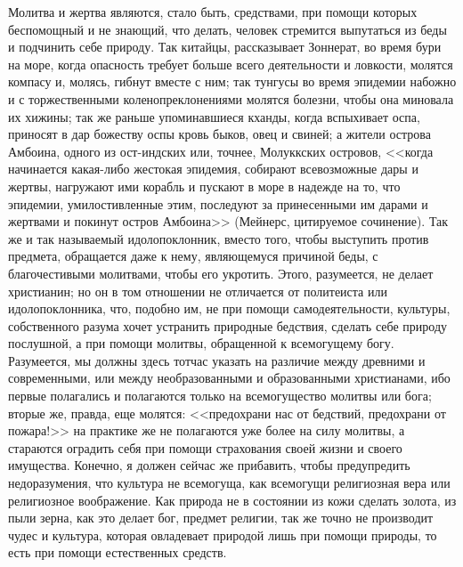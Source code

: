 \documentclass[12pt]{article}
\begin{document}
Молитва и жертва являются, стало быть, средствами, при помощи которых беспомощный и не знающий, что делать, человек стремится выпутаться из беды и подчинить себе природу. Так китайцы, рассказывает Зоннерат, во время бури на море, когда опасность требует больше всего деятельности и ловкости, молятся компасу и, молясь, гибнут вместе с ним; так тунгусы во время эпидемии набожно и с торжественными коленопреклонениями молятся болезни, чтобы она миновала их хижины; так же раньше упоминавшиеся кханды, когда вспыхивает оспа, приносят в дар божеству оспы кровь быков, овец и свиней; а жители острова Амбоина, одного из ост-индских или, точнее, Молуккских островов, <<когда начинается какая-либо жестокая эпидемия, собирают всевозможные дары и жертвы, нагружают ими корабль и пускают в море в надежде на то, что эпидемии, умилостивленные этим, последуют за принесенными им дарами и жертвами и покинут остров Амбоина>> (Мейнерс, цитируемое сочинение). Так же и так называемый идолопоклонник, вместо того, чтобы выступить против предмета, обращается даже к нему, являющемуся причиной беды, с благочестивыми молитвами, чтобы его укротить. Этого, разумеется, не делает христианин; но он в том отношении не отличается от политеиста или идолопоклонника, что, подобно им, не при помощи самодеятельности, культуры, собственного разума хочет устранить природные бедствия, сделать себе природу послушной, а при помощи молитвы, обращенной к всемогущему богу. Разумеется, мы должны здесь тотчас указать на различие между древними и современными, или между необразованными и образованными христианами, ибо первые полагались и полагаются только на всемогущество молитвы или бога; вторые же, правда, еще молятся: <<предохрани нас от бедствий, предохрани от пожара!>> на практике же не полагаются уже более на силу молитвы, а стараются оградить себя при помощи страхования своей жизни и своего имущества. Конечно, я должен сейчас же прибавить, чтобы предупредить недоразумения, что культура не всемогуща, как всемогущи религиозная вера или религиозное воображение. Как природа не в состоянии из кожи сделать золота, из пыли зерна, как это делает бог, предмет религии, так же точно не производит чудес и культура, которая овладевает природой лишь при помощи природы, то есть при помощи естественных средств. 
\end{document}
